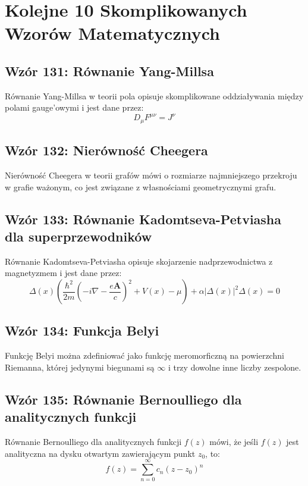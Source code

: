 \documentclass{article}
\begin{document}
\section*{Kolejne 10 Skomplikowanych Wzorów Matematycznych}

\subsection*{Wzór 131: Równanie Yang-Millsa}

Równanie Yang-Millsa w teorii pola opisuje skomplikowane oddziaływania między polami gauge'owymi i jest dane przez:
\[ D_\mu F^{\mu\nu} = J^\nu \]

\subsection*{Wzór 132: Nierówność Cheegera}

Nierówność Cheegera w teorii grafów mówi o rozmiarze najmniejszego przekroju w grafie ważonym, co jest związane z własnościami geometrycznymi grafu.

\subsection*{Wzór 133: Równanie Kadomtseva-Petviasha dla superprzewodników}

Równanie Kadomtseva-Petviasha opisuje skojarzenie nadprzewodnictwa z magnetyzmem i jest dane przez:
\[ \Delta(x)\left(\frac{\hbar^2}{2m}(-i\nabla-\frac{e\mathbf{A}}{c})^2 + V(x) - \mu\right) + \alpha|\Delta(x)|^2\Delta(x) = 0 \]

\subsection*{Wzór 134: Funkcja Belyi}

Funkcję Belyi można zdefiniować jako funkcję meromorficzną na powierzchni Riemanna, której jedynymi biegunami są \(\infty\) i trzy dowolne inne liczby zespolone.

\subsection*{Wzór 135: Równanie Bernoulliego dla analitycznych funkcji}

Równanie Bernoulliego dla analitycznych funkcji \(f(z)\) mówi, że jeśli \(f(z)\) jest analityczna na dysku otwartym zawierającym punkt \(z_0\), to:
\[ f(z) = \sum_{n=0}^{\infty} c_n(z-z_0)^n \]
\end{document}

